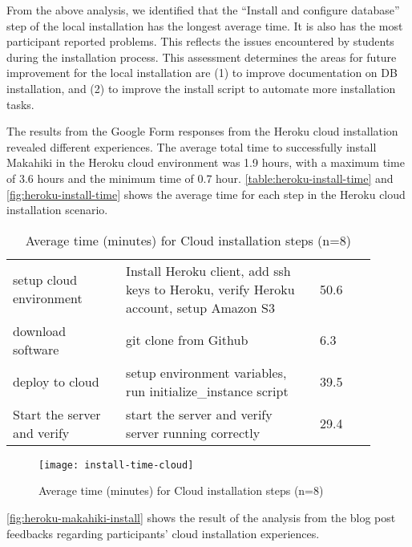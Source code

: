 From the above analysis, we identified that the ``Install and configure database'' step of the local installation has the
longest average time. It is also has the most participant reported problems. This reflects the issues
encountered by students during the installation process. This assessment determines the areas for future
improvement for the local installation are (1) to improve documentation on DB installation, and (2) to improve the install script to automate more installation tasks.

The results from the Google Form responses from the Heroku cloud installation revealed different experiences. The average total time to successfully install Makahiki in the Heroku cloud environment was 1.9 hours, with a maximum time of 3.6 hours and the minimum time of 0.7 hour. \autoref{table:heroku-install-time} and \autoref{fig:heroku-install-time} shows the average time for each step in the Heroku cloud installation scenario.

\begin{table}[ht!]
  \centering
  \begin{tabular}{|P{0.28\linewidth}|P{0.48\linewidth}|P{0.14\linewidth}|}
    \hline
     &  &  \\
    \hline
    setup cloud environment & Install Heroku client, add ssh keys to Heroku, verify Heroku account, setup Amazon S3 & 50.6 \\
    \hline
    download software & git clone from Github & 6.3 \\
    \hline
    deploy to cloud & setup environment variables, run initialize\_instance script & 39.5 \\
    \hline
    Start the server and verify & start the server and verify server running correctly & 29.4 \\
        \hline
  \end{tabular}
  \caption{Average time (minutes) for Cloud installation steps (n=8)}
  \label{table:heroku-install-time}
\end{table}
    
\begin{figure}[ht!]
  \center
  \texttt{[image: install-time-cloud]}
  \caption{Average time (minutes) for Cloud installation steps (n=8)}
  \label{fig:heroku-install-time}
\end{figure}

\autoref{fig:heroku-makahiki-install} shows the result of the analysis from
the blog post feedbacks regarding participants' cloud installation experiences.

